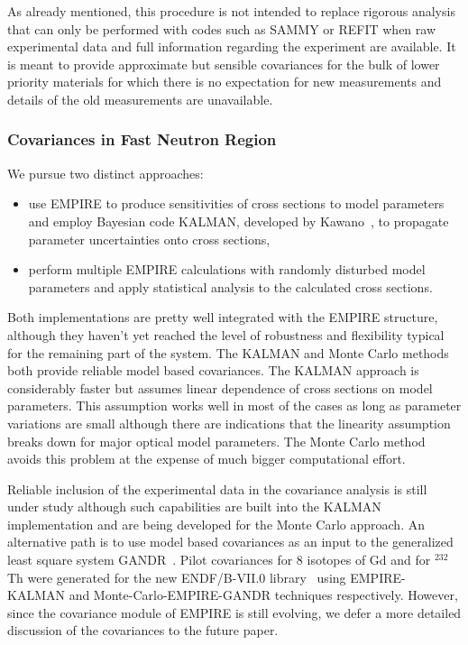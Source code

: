 As already mentioned, this procedure is not intended to replace rigorous
analysis that can only be performed with codes such as SAMMY or REFIT when
raw experimental data and full information regarding the experiment are
available. It is meant to provide approximate but sensible covariances for
the bulk of lower priority materials for which there is no expectation for
new measurements and details of the old measurements are unavailable.

\subsubsection{Covariances in Fast Neutron Region}

We pursue two distinct approaches:

\begin{itemize}
\item use EMPIRE to produce sensitivities of cross sections to model
parameters and employ Bayesian code KALMAN, developed by Kawano~\cite%
{Kawano:97}, to propagate parameter uncertainties onto cross sections,

\item perform multiple EMPIRE calculations with randomly disturbed model
parameters and apply statistical analysis to the calculated cross sections.
\end{itemize}

Both implementations are pretty well integrated with the EMPIRE structure,
although they haven't yet reached the level of robustness and flexibility
typical for the remaining part of the system. The KALMAN and Monte Carlo
methods both provide reliable model based covariances. The KALMAN approach
is considerably faster but assumes linear dependence of cross sections on
model parameters. This assumption works well in most of the cases as long as
parameter variations are small although there are indications that the
linearity assumption breaks down for major optical model parameters. The
Monte Carlo method avoids this problem at the expense of much bigger
computational effort.

Reliable inclusion of the experimental data in the covariance analysis is
still under study although such capabilities are built into the KALMAN
implementation and are being developed for the Monte Carlo approach. An
alternative path is to use model based covariances as an input to the
generalized least square system GANDR~\cite{GANDR}. Pilot covariances for 8
isotopes of Gd and for $^{232}$Th were generated for the new ENDF/B-VII.0
library~\cite{ENDF-VII} using EMPIRE-KALMAN and Monte-Carlo-EMPIRE-GANDR
techniques respectively. However, since the covariance module of EMPIRE is
still evolving, we defer a more detailed discussion of the covariances to
the future paper.

